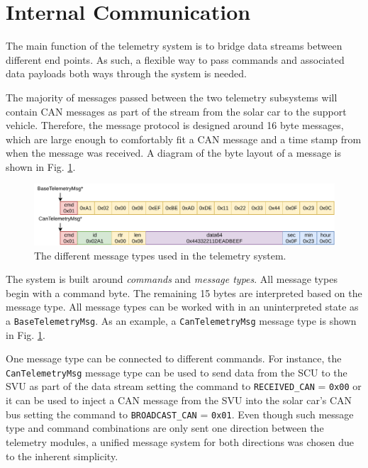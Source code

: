 \documentclass[a4paper,conference]{IEEEtran}
\begin{document}
\section{Internal Communication}
The main function of the telemetry system is to bridge data streams between different end points. As such, a flexible way to pass commands and associated data payloads both ways through the system is needed. 

The majority of messages passed between the two telemetry subsystems will contain CAN messages as part of the stream from the solar car to the support vehicle. Therefore, the message protocol is designed around 16 byte messages, which are large enough to comfortably fit a CAN message and a time stamp from when the message was received. A diagram of the byte layout of a message is shown in Fig. \ref{fig:messageTypes}.

\begin{figure}[b]
    \centering
    \includegraphics[width=\linewidth]{documentation/images/MessageTypes.pdf}
    \caption{The different message types used in the telemetry system.}
    \label{fig:messageTypes}
\end{figure}

The system is built around \textit{commands} and \textit{message types}. All message types begin with a command byte. The remaining 15 bytes are interpreted based on the message type. All message types can be worked with in an uninterpreted state as a \texttt{BaseTelemetryMsg}. As an example, a \texttt{CanTelemetryMsg} message type is shown in Fig. \ref{fig:messageTypes}. 

One message type can be connected to different commands. For instance, the \texttt{CanTelemetryMsg} message type can be used to send data from the SCU to the SVU as part of the data stream setting the command to \texttt{RECEIVED\_CAN} = \texttt{0x00} or it can be used to inject a CAN message from the SVU into the solar car's CAN bus setting the command to \texttt{BROADCAST\_CAN} = \texttt{0x01}. Even though such message type and command combinations are only sent one direction between the telemetry modules, a unified message system for both directions was chosen due to the inherent simplicity.
\end{document}
